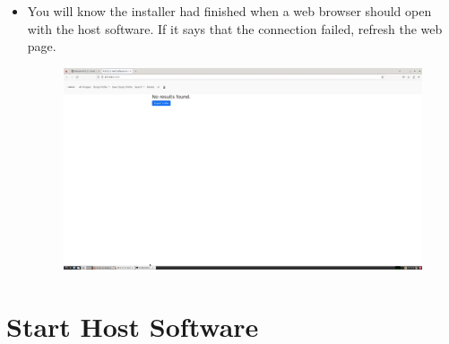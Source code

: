 \documentclass[12pt]{article}
\begin{document}
\begin{center}
\begin{itemize}
\begin{figure}[H]
		      \end{figure}
		\item You will know the installer had finished when a web browser should open with the host software. If it says that the connection failed, refresh the web page.
		      \begin{figure}[H]
			      \includegraphics[width=\textwidth]{Figures/Linux-Host-Software-Install-Finish.png}
		      \end{figure}
	\end{itemize}
	\section{Start Host Software}

\end{center}
\end{document}

